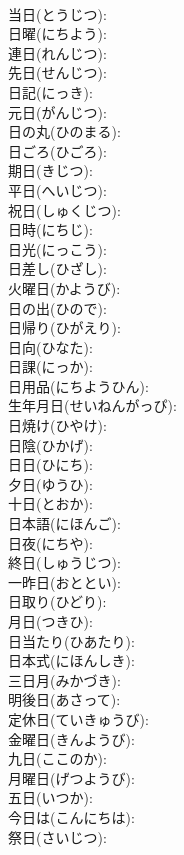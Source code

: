 \documentclass[8pt]{extreport}
\begin{document}
\begin{CJK}{UTF8}{min}
\\	当日(とうじつ): 
\\	日曜(にちよう): 
\\	連日(れんじつ): 
\\	先日(せんじつ): 
\\	日記(にっき): 
\\	元日(がんじつ): 
\\	日の丸(ひのまる): 
\\	日ごろ(ひごろ): 
\\	期日(きじつ): 
\\	平日(へいじつ): 
\\	祝日(しゅくじつ): 
\\	日時(にちじ): 
\\	日光(にっこう): 
\\	日差し(ひざし): 
\\	火曜日(かようび): 
\\	日の出(ひので): 
\\	日帰り(ひがえり): 
\\	日向(ひなた): 
\\	日課(にっか): 
\\	日用品(にちようひん): 
\\	生年月日(せいねんがっぴ): 
\\	日焼け(ひやけ): 
\\	日陰(ひかげ): 
\\	日日(ひにち): 
\\	夕日(ゆうひ): 
\\	十日(とおか): 
\\	日本語(にほんご): 
\\	日夜(にちや): 
\\	終日(しゅうじつ): 
\\	一昨日(おととい): 
\\	日取り(ひどり): 
\\	月日(つきひ): 
\\	日当たり(ひあたり): 
\\	日本式(にほんしき): 
\\	三日月(みかづき): 
\\	明後日(あさって): 
\\	定休日(ていきゅうび): 
\\	金曜日(きんようび): 
\\	九日(ここのか): 
\\	月曜日(げつようび): 
\\	五日(いつか): 
\\	今日は(こんにちは): 
\\	祭日(さいじつ): 

\end{CJK}
\end{document}

